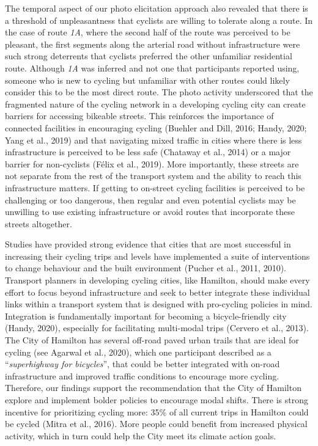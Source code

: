 \documentclass[]{elsarticle} %
\begin{document}
The temporal aspect of our photo elicitation approach also revealed that
there is a threshold of unpleasantness that cyclists are willing to
tolerate along a route. In the case of route \emph{1A}, where the second
half of the route was perceived to be pleasant, the first segments along
the arterial road without infrastructure were such strong deterrents
that cyclists preferred the other unfamiliar residential route. Although
\emph{1A} was inferred and not one that participants reported using,
someone who is new to cycling but unfamiliar with other routes could
likely consider this to be the most direct route. The photo activity
underscored that the fragmented nature of the cycling network in a
developing cycling city can create barriers for accessing bikeable
streets. This reinforces the importance of connected facilities in
encouraging cycling (Buehler and Dill, 2016; Handy, 2020; Yang et al.,
2019) and that navigating mixed traffic in cities where there is less
infrastructure is perceived to be less safe (Chataway et al., 2014) or a
major barrier for non-cyclists (Félix et al., 2019). More importantly,
these streets are not separate from the rest of the transport system and
the ability to reach this infrastructure matters. If getting to
on-street cycling facilities is perceived to be challenging or too
dangerous, then regular and even potential cyclists may be unwilling to
use existing infrastructure or avoid routes that incorporate these
streets altogether.

Studies have provided strong evidence that cities that are most
successful in increasing their cycling trips and levels have implemented
a suite of interventions to change behaviour and the built environment
(Pucher et al., 2011, 2010). Transport planners in developing cycling
cities, like Hamilton, should make every effort to focus beyond
infrastructure and seek to better integrate these individual links
within a transport system that is designed with pro-cycling policies in
mind. Integration is fundamentally important for becoming a
bicycle-friendly city (Handy, 2020), especially for facilitating
multi-modal trips (Cervero et al., 2013). The City of Hamilton has
several off-road paved urban trails that are ideal for cycling (see
Agarwal et al., 2020), which one participant described as a
``\emph{superhighway for bicycles}'', that could be better integrated
with on-road infrastructure and improved traffic conditions to encourage
more cycling. Therefore, our findings support the recommendation that
the City of Hamilton explore and implement bolder policies to encourage
modal shifts. There is strong incentive for prioritizing cycling more:
35\% of all current trips in Hamilton could be cycled (Mitra et al.,
2016). More people could benefit from increased physical activity, which
in turn could help the City meet its climate action goals.
\end{document}
